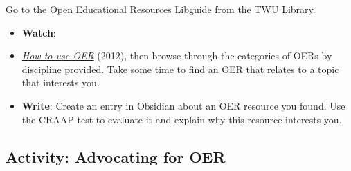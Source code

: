 \documentclass[
  letterpaper,
  DIV=11,
  numbers=noendperiod]{scrreprt}
\begin{document}
\begin{tcolorbox}[enhanced jigsaw, toprule=.15mm, colback=white, colframe=quarto-callout-note-color-frame, bottomtitle=1mm, leftrule=.75mm, coltitle=black, titlerule=0mm, rightrule=.15mm, colbacktitle=quarto-callout-note-color!10!white, left=2mm, title={Learning Activity}, opacitybacktitle=0.6, opacityback=0, breakable, toptitle=1mm, arc=.35mm, bottomrule=.15mm]

Go to the \href{https://libguides.twu.ca/oer}{Open Educational Resources
Libguide} from the TWU Library.

\begin{itemize}
\item
  \textbf{Watch}:
\item
  \href{https://www.youtube.com/watch?v=Hkz4q2yuQU8}{\emph{How to use
  OER}} (2012), then browse through the categories of OERs by discipline
  provided. Take some time to find an OER that relates to a topic that
  interests you.
\item
  \textbf{Write}: Create an entry in Obsidian about an OER resource you
  found. Use the CRAAP test to evaluate it and explain why this resource
  interests you.
\end{itemize}

\end{tcolorbox}

\subsection{Activity: Advocating for
OER}\label{activity-advocating-for-oer}
\end{document}
